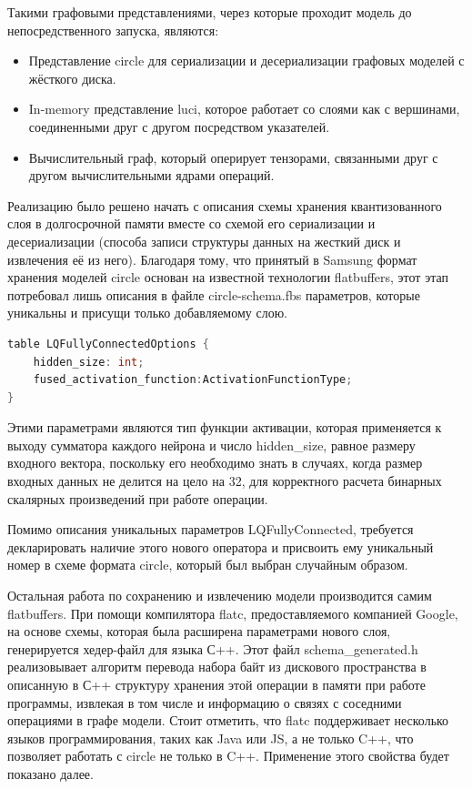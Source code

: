 Такими графовыми представлениями, через которые проходит модель до непосредственного запуска, являются:
\begin{itemize}
    \item Представление circle для сериализации и десериализации графовых моделей с жёсткого диска.
    \item In-memory представление luci, которое работает со слоями как с вершинами, соединенными друг с другом посредством указателей.
    \item Вычислительный граф, который оперирует тензорами, связанными друг с другом вычислительными ядрами операций.
\end{itemize}

Реализацию было решено начать с описания схемы хранения квантизованного слоя в долгосрочной памяти  вместе со схемой его сериализации и десериализации (способа записи структуры данных на жесткий диск и извлечения её из него). Благодаря тому, что принятый в Samsung формат хранения моделей circle основан на известной технологии flatbuffers, этот этап потребовал лишь описания в файле circle-schema.fbs параметров, которые уникальны и присущи только добавляемому слою. 

\begin{lstlisting}[language=C++, caption={Структура слоя в схеме}]
table LQFullyConnectedOptions {
	hidden_size: int;
	fused_activation_function:ActivationFunctionType;
}
\end{lstlisting}

Этими параметрами являются тип функции активации, которая применяется к выходу сумматора каждого нейрона и число hidden\_size, равное размеру входного вектора, поскольку его необходимо знать в случаях, когда размер входных данных не делится на цело на 32, для корректного расчета бинарных скалярных произведений при работе операции.

Помимо описания уникальных параметров LQFullyConnected, требуется декларировать наличие этого нового оператора и присвоить ему уникальный номер в схеме формата circle, который был выбран случайным образом.

Остальная работа по сохранению и извлечению модели производится самим flatbuffers. При помощи компилятора flatc, предоставляемого компанией Google, на основе схемы, которая была расширена параметрами нового слоя, генерируется хедер-файл для языка С++. Этот файл schema\_generated.h реализовывает алгоритм перевода набора байт из дискового пространства в описанную в С++ структуру хранения этой операции в памяти при работе программы, извлекая в том числе и информацию о связях с соседними операциями в графе модели. Стоит отметить, что flatc поддерживает несколько языков программирования, таких как Java или JS, а не только C++, что позволяет работать с circle не только в C++. Применение этого свойства будет показано далее.

